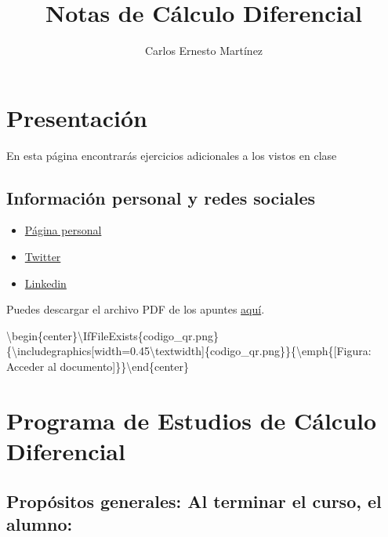 \documentclass[12pt]{article}
\title{Notas de Cálculo Diferencial}
\author{Carlos Ernesto Martínez}
\date{}
\providecommand{\tightlist}{\setlength{\itemsep}{0pt}\setlength{\parskip}{0pt}}
\begin{document}
\maketitle
\tableofcontents
\newpage
\section{Presentación}\label{presentaciuxf3n}

En esta página encontrarás ejercicios adicionales a los vistos en clase

\subsection{Información personal y redes
sociales}\label{informaciuxf3n-personal-y-redes-sociales}

\begin{itemize}
\tightlist
\item
  \href{https://directorioprofesores.uacm.edu.mx/profesor.html?key=2003080144}{Página
  personal}
\item
  \href{https://twitter.com/carlosmroder}{Twitter}
\item
  \href{https://www.linkedin.com/in/carlos-martinez-r/}{Linkedin}
\end{itemize}

Puedes descargar el archivo PDF de los apuntes
\href{https://github.com/ProfTodoMundo/NotasCalculoDiferencial/blob/PrincipalCD/docs/ApuntesCalculo.pdf}{aquí}.

\textbackslash begin\{center\}\textbackslash IfFileExists\{codigo\_qr.png\}\{\textbackslash includegraphics{[}width=0.45\textbackslash textwidth{]}\{codigo\_qr.png\}\}\{\textbackslash emph\{{[}Figura:
Acceder al documento{]}\}\}\textbackslash end\{center\}

\section{Programa de Estudios de Cálculo
Diferencial}\label{programa-de-estudios-de-cuxe1lculo-diferencial}

\subsection{Propósitos generales: Al terminar el curso, el
alumno:}\label{propuxf3sitos-generales-al-terminar-el-curso-el-alumno}
\end{document}
